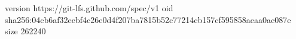 version https://git-lfs.github.com/spec/v1
oid sha256:04cb6af32eebf4c26e0d4f207ba7815b52c77214cb157cf595858aeaa0ac087e
size 262240
